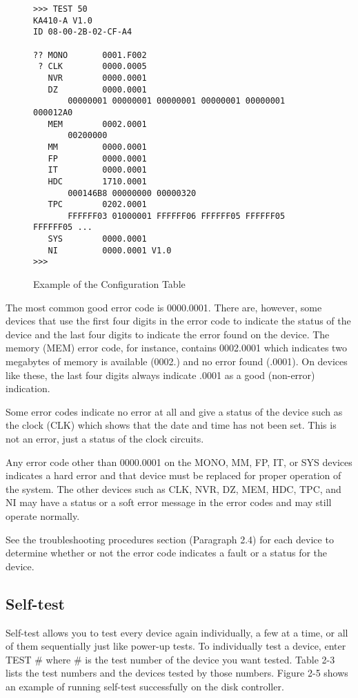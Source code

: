 \documentclass{decsectional}
\begin{document}
\begin{figure}[H]
\caption{Example of the Configuration Table}
\begin{verbatim}
>>> TEST 50
KA410-A V1.0
ID 08-00-2B-02-CF-A4

?? MONO       0001.F002
 ? CLK        0000.0005
   NVR        0000.0001
   DZ         0000.0001
       00000001 00000001 00000001 00000001 00000001 000012A0
   MEM        0002.0001
       00200000
   MM         0000.0001
   FP         0000.0001
   IT         0000.0001
   HDC        1710.0001
       000146B8 00000000 00000320
   TPC        0202.0001
       FFFFFF03 01000001 FFFFFF06 FFFFFF05 FFFFFF05 FFFFFF05 ...
   SYS        0000.0001
   NI         0000.0001 V1.0
>>>
\end{verbatim}
\end{figure}

The most common good error code is 0000.0001. There are, however, some
devices that use the first four digits in the error code to indicate the status
of the device and the last four digits to indicate the error found on the
device. The memory (MEM) error code, for instance, contains 0002.0001
which indicates two megabytes of memory is available (0002.) and no error
found (.0001). On devices like these, the last four digits always indicate
.0001 as a good (non-error) indication.

Some error codes indicate no error at all and give a status of the device
such as the clock (CLK) which shows that the date and time has not been
set. This is not an error, just a status of the clock circuits.

Any error code other than 0000.0001 on the MONO, MM, FP, IT, or SYS
devices indicates a hard error and that device must be replaced for proper
operation of the system. The other devices such as CLK, NVR, DZ, MEM,
HDC, TPC, and NI may have a status or a soft error message in the error
codes and may still operate normally.

See the troubleshooting procedures section (Paragraph 2.4) for each device
to determine whether or not the error code indicates a fault or a status for
the device.

\subsection{Self-test}

Self-test allows you to test every device again individually, a few at a time,
or all of them sequentially just like power-up tests. To individually test a
device, enter TEST \# where \# is the test number of the device you want
tested. Table 2-3 lists the test numbers and the devices tested by those
numbers. Figure 2-5 shows an example of running self-test successfully on
the disk controller.
\end{document}
